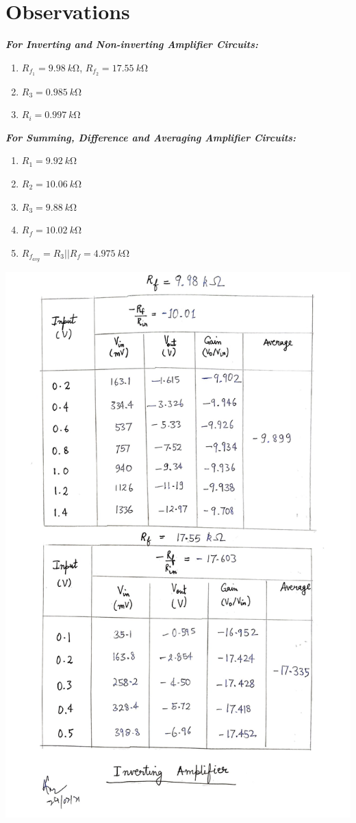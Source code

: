 \section{Observations}
\noindent \textbf{\emph{For Inverting and Non-inverting Amplifier Circuits:}}
\begin{enumerate}
    \item $R_{f_1} = \SI{9.98}{k\ohm}$, $R_{f_2} = \SI{17.55}{k\ohm}$
    \item $R_3 = \SI{0.985}{k\ohm}$
    \item $R_i = \SI{0.997}{k\ohm}$
\end{enumerate}
\textbf{\emph{For Summing, Difference and Averaging Amplifier Circuits:}}
\begin{enumerate}
    \item $R_1 = \SI{9.92}{k\ohm}$
    \item $R_2 = \SI{10.06}{k\ohm}$
    \item $R_3 = \SI{9.88}{k\ohm}$
    \item $R_f = \SI{10.02}{k\ohm}$
    \item $R_{f_{avg}} = R_3 || R_f = \SI{4.975}{k\ohm}$
\end{enumerate}
\clearpage
\begin{center}
    \includegraphics[scale = 0.25]{OPAMP Config/invamp.jpg}
\end{center}
